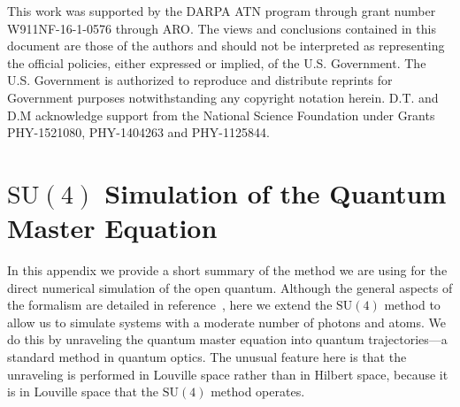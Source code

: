 \documentclass[aps,
twocolumn,
showpacs,
superscriptaddress,groupedaddress]{revtex4}
\begin{document}
\begin{acknowledgments}
  This work was supported by the DARPA ATN program through grant
  number W911NF-16-1-0576 through ARO. The views and conclusions
  contained in this document are those of the authors and should not
  be interpreted as representing the official policies, either
  expressed or implied, of the U.S. Government. The U.S. Government is
  authorized to reproduce and distribute reprints for Government
  purposes notwithstanding any copyright notation herein. D.T. and
  D.M acknowledge support from the National Science Foundation under
  Grants PHY-1521080, PHY-1404263 and PHY-1125844.
\end{acknowledgments}

\appendix

\section{$\mathrm{SU}(4)$ Simulation of the Quantum Master Equation}
\label{Su4Appendix}

In this appendix we provide a short summary of the method we are using
for the direct numerical simulation of the open quantum.  Although the
general aspects of the formalism are detailed in
reference~\cite{PhysRevA.87.062101}, here we extend the $\mathrm{SU}(4)$
method to allow us to simulate systems with a moderate number of photons
and atoms.  We do this by unraveling the quantum master equation into
quantum trajectories---a standard method in quantum optics.  The unusual
feature here is that the unraveling is performed in Louville space
rather than in Hilbert space, because it is in Louville space that the
$\mathrm{SU}(4)$ method operates.
\end{document}

